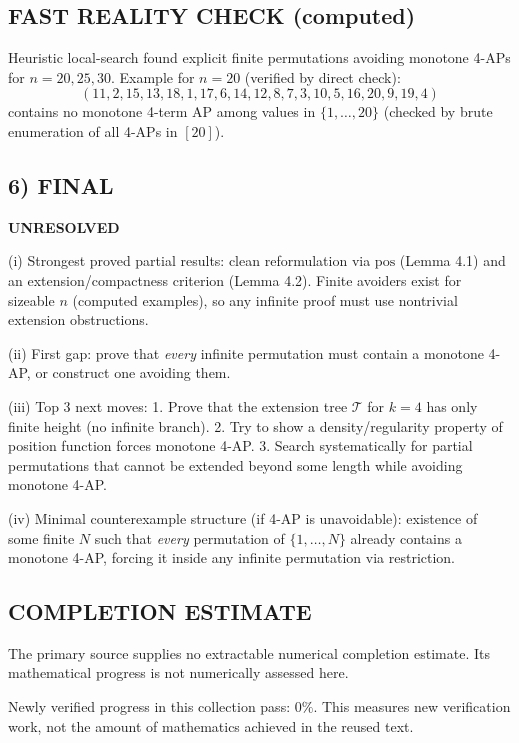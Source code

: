 \subsection*{FAST REALITY CHECK (computed)}
Heuristic local-search found explicit finite permutations avoiding monotone 4-APs for $n=20,25,30$.
Example for $n=20$ (verified by direct check):
\[
(11,2,15,13,18,1,17,6,14,12,8,7,3,10,5,16,20,9,19,4)
\]
contains no monotone 4-term AP among values in $\{1,\dots,20\}$ (checked by brute enumeration of all 4-APs in $[20]$).

\subsection*{6) FINAL}
\textbf{UNRESOLVED}

(i) Strongest proved partial results: clean reformulation via $\mathrm{pos}$ (Lemma 4.1) and an extension/compactness criterion (Lemma 4.2).
Finite avoiders exist for sizeable $n$ (computed examples), so any infinite proof must use nontrivial extension obstructions.

(ii) First gap: prove that \emph{every} infinite permutation must contain a monotone 4-AP, or construct one avoiding them.

(iii) Top 3 next moves:
1. Prove that the extension tree $\mathcal{T}$ for $k=4$ has only finite height (no infinite branch).
2. Try to show a density/regularity property of position function forces monotone 4-AP.
3. Search systematically for partial permutations that cannot be extended beyond some length while avoiding monotone 4-AP.

(iv) Minimal counterexample structure (if 4-AP is unavoidable): existence of some finite $N$ such that \emph{every} permutation of $\{1,\dots,N\}$
already contains a monotone 4-AP, forcing it inside any infinite permutation via restriction.



\subsection*{COMPLETION ESTIMATE}
The primary source supplies no extractable numerical completion estimate. Its mathematical progress is not numerically assessed here.

Newly verified progress in this collection pass: $0\%$. This measures new verification work, not the amount of mathematics achieved in the reused text.
